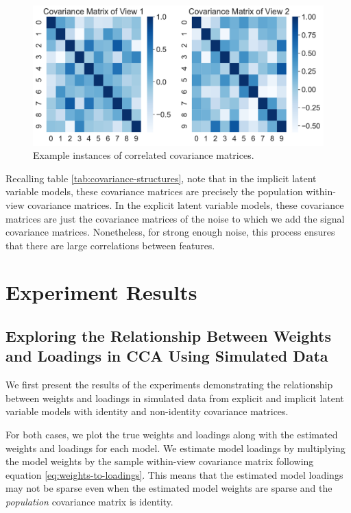 \begin{figure}
    \centering
    \includegraphics[width=0.8\linewidth]{figures/simulated/explicit/True_Covariance_Correlated.pdf}
    \caption{Example instances of correlated covariance matrices.}\label{fig:covariance-matrices}
\end{figure}

Recalling table \ref{tab:covariance-structures}, note that in the implicit latent variable models, these covariance matrices are precisely the population within-view covariance matrices.
In the explicit latent variable models, these covariance matrices are just the covariance matrices of the noise to which we add the signal covariance matrices.
Nonetheless, for strong enough noise, this process ensures that there are large correlations between features.

\section{Experiment Results}

\subsection{Exploring the Relationship Between Weights and Loadings in CCA Using Simulated Data}

We first present the results of the experiments demonstrating the relationship between weights and \gls{loadings} in simulated data from explicit and implicit latent variable models with identity and non-identity covariance matrices.

For both cases, we plot the true weights and loadings along with the estimated weights and loadings for each model.
We estimate model loadings by multiplying the model weights by the sample within-view covariance matrix following equation \ref{eq:weights-to-loadings}.
This means that the estimated model loadings may not be sparse even when the estimated model weights are sparse and the \textit{population} covariance matrix is identity.

